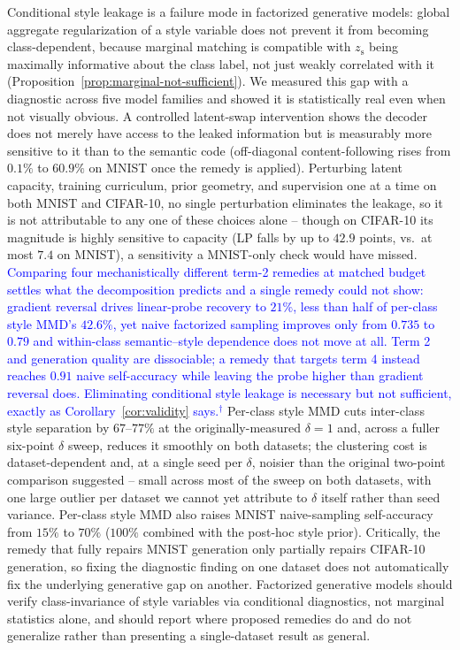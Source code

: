 \documentclass[10pt,letterpaper]{article}
\newcommand{\zs}{z_{\mathrm{s}}}
\newcommand{\pj}[1]{\textcolor{blue}{#1$^{\dagger}$}}
\begin{document}
Conditional style leakage is a failure mode in factorized generative
models: global aggregate regularization of a style variable does not
prevent it from becoming class-dependent, because marginal matching is
compatible with $\zs$ being maximally informative about the class label,
not just weakly correlated with it (Proposition~\ref{prop:marginal-not-sufficient}).
We measured this gap with a diagnostic across five model families and
showed it is statistically real even when not visually obvious. A
controlled latent-swap intervention shows the decoder does not merely have access
to the leaked information but is measurably more sensitive to it than to the
semantic code (off-diagonal content-following rises from $0.1\%$ to $60.9\%$
on MNIST once the remedy is applied). Perturbing latent capacity, training
curriculum, prior geometry, and supervision one at a time on both MNIST and
CIFAR-10, no single perturbation eliminates the leakage, so it is not
attributable to any one of these choices alone -- though on CIFAR-10 its
magnitude is highly sensitive to capacity (LP falls by up to $42.9$ points,
vs.\ at most $7.4$ on MNIST), a sensitivity a MNIST-only check would have
missed. \pj{Comparing four mechanistically different term-2 remedies at
matched budget settles what the decomposition predicts and a single remedy
could not show: gradient reversal drives linear-probe recovery to $21\%$,
less than half of per-class style MMD's $42.6\%$, yet naive factorized
sampling improves only from $0.735$ to $0.79$ and within-class
semantic--style dependence does not move at all. Term 2 and generation
quality are dissociable; a remedy that targets term 4 instead reaches
$0.91$ naive self-accuracy while leaving the probe higher than gradient
reversal does. Eliminating conditional style leakage is necessary but not
sufficient, exactly as Corollary~\ref{cor:validity} says.} Per-class style
MMD cuts inter-class style separation by
$67$--$77\%$ at the originally-measured $\delta{=}1$ and, across a fuller
six-point $\delta$ sweep, reduces it smoothly on both datasets; the
clustering cost is dataset-dependent and, at a single seed per $\delta$,
noisier than the original two-point comparison suggested -- small across
most of the sweep on both datasets, with one large outlier per dataset we
cannot yet attribute to $\delta$ itself rather than seed variance. Per-class
style MMD also raises MNIST naive-sampling self-accuracy from $15\%$ to
$70\%$ ($100\%$ combined with the post-hoc style prior). Critically, the remedy
that fully repairs MNIST generation only partially repairs CIFAR-10
generation, so fixing the diagnostic finding on one dataset does not
automatically fix the underlying generative gap on another. Factorized
generative models should verify class-invariance of style variables via
conditional diagnostics, not marginal statistics alone, and should report
where proposed remedies do and do not generalize rather than presenting a
single-dataset result as general.
\end{document}
